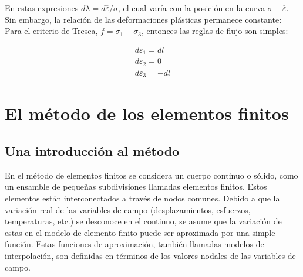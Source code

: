 En estas expresiones $d\lambda = d \overline{\varepsilon} / \overline{\sigma} $, el cual varía 
con la posición en la curva $ \overline{\sigma} - \overline{\varepsilon} $. Sin embargo, la 
relación de las deformaciones plásticas permanece constante: ~\cite{hosford2007} \\


Para el criterio de Tresca, $f = \sigma_1 - \sigma_3$, entonces las reglas de flujo son simples:
~\cite{hosford2007}

\begin{align*}
d\varepsilon_1 = dl \\
d\varepsilon_2 = 0 \\
d\varepsilon_3 = -dl
\end{align*}



\section{El método de los elementos finitos}

\subsection{Una introducción al método}

En el método de elementos finitos se considera un cuerpo continuo o sólido, como un ensamble de pequeñas 
subdivisiones llamadas elementos finitos. Estos elementos están interconectados a través de nodos comunes. 
Debido a que la variación real de las variables de campo (desplazamientos, esfuerzos, temperaturas, etc.) 
se desconoce en el continuo, se asume que la variación de estas en el modelo de elemento finito puede ser 
aproximada por una simple función. Estas funciones de aproximación, también llamadas modelos de interpolación, 
son definidas en términos de los valores nodales de las variables de campo.\\

